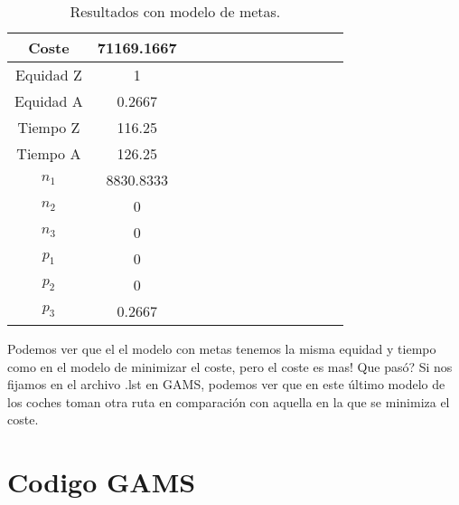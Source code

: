 \documentclass[]{article}
\begin{document}
\begin{table}[H]
\begin{center}
\begin{tabular}{|c|c|c|c|c|c|c|c|c|c|c|c|c|}
\hline
Coste & 71169.1667\\
\hline
Equidad Z & 1\\
Equidad A & 0.2667\\
\hline
Tiempo Z & 116.25 \\
Tiempo A & 126.25 \\
\hline
$n_1$ & 8830.8333 \\
$n_2$ & 0\\
$n_3$ & 0\\
\hline
$p_1$ & 0\\
$p_2$ & 0\\
$p_3$ & 0.2667\\
\hline
\end{tabular}
\caption{Resultados con modelo de metas.}
\label{tab:metas}
\end{center}
\end{table}

\noindent Podemos ver que el el modelo con metas tenemos la misma equidad y tiempo como en el modelo de minimizar el coste, pero el coste es mas! Que pasó? Si nos fijamos en el archivo .lst en GAMS, podemos ver que en este último modelo de los coches toman otra ruta en comparación con aquella en la que se minimiza el coste.

\section{Codigo GAMS}
\end{document}
